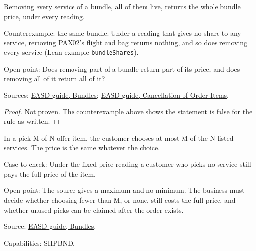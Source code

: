 \begin{theorem}
  \label{thm:ancillaries-bundle-return-all}
  Removing every service of a bundle, all of them live, returns the whole
  bundle price, under every reading.

  Counterexample: the same bundle.  Under a reading that gives no share to
  any service, removing PAX02's flight and bag returns nothing, and so does
  removing every service (Lean example \texttt{bundleShares}).

  Open point: Does removing part of a bundle return part of its price, and
  does removing all of it return all of it?

  Sources: \href{https://standards.atlassian.net/wiki/spaces/EASD/pages/574619818}{EASD guide, Bundles};
  \href{https://standards.atlassian.net/wiki/spaces/EASD/pages/574783569}{EASD guide, Cancellation of Order Items}.
\end{theorem}
\begin{proof}
  Not proven.  The counterexample above shows the statement is false for the
  rule as written.
\end{proof}

\begin{theorem}
  \label{thm:ancillaries-pick-m-of-n}
  \notready
  In a pick M of N offer item, the customer chooses at most M of the N
  listed services. The price is the same whatever the choice.

  Case to check: Under the fixed price reading a customer who picks no
  service still pays the full price of the item.

  Open point: The source gives a maximum and no minimum. The business must
  decide whether choosing fewer than M, or none, still costs the full price,
  and whether unused picks can be claimed after the order exists.

  Source: \href{https://standards.atlassian.net/wiki/spaces/EASD/pages/574619818}{EASD guide, Bundles}.

  Capabilities: SHPBND.
\end{theorem}

